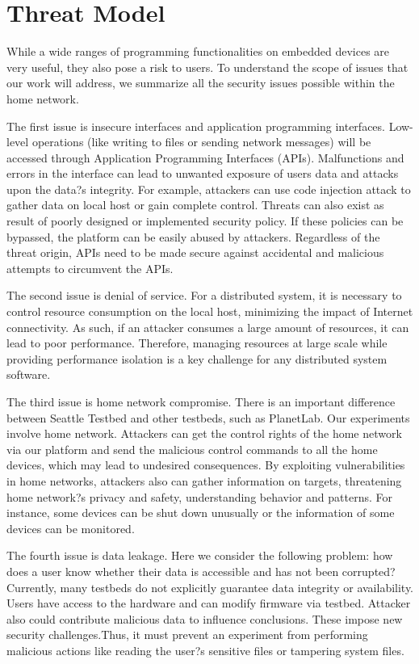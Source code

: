 \section{Threat Model}
\label{sec.threat_model}
While a wide ranges of programming functionalities on embedded devices are very useful, they also pose a risk to users. To understand the scope of issues that our work will address, we summarize all the security issues possible within the home network.

The first issue is insecure interfaces and application programming interfaces. Low-level operations (like writing to files or sending network messages) will be accessed through Application Programming Interfaces (APIs). Malfunctions and errors in the interface can lead to unwanted exposure of users data and attacks upon the data?s integrity. For example, attackers can use code injection attack to gather data on local host or gain complete control. Threats can also exist as result of  poorly designed or implemented security policy. If these policies can be bypassed, the platform can be easily abused by attackers. Regardless of the threat origin, APIs need to be made secure against accidental and malicious attempts to circumvent the APIs.

The second issue is denial of service. For a distributed system, it is necessary to control resource consumption on the local host, minimizing the impact of Internet connectivity. As such, if an attacker consumes a large amount of resources, it can lead to poor performance. Therefore, managing resources at large scale while providing performance isolation is a key challenge for any distributed system software.

The third issue is home network compromise. There is an important difference between Seattle Testbed and other testbeds, such as PlanetLab. Our experiments involve home network. Attackers can get the control rights of the home network via our platform and send the malicious control commands to all the home devices, which may lead to undesired consequences. By exploiting vulnerabilities in home networks, attackers also can gather information on targets, threatening home network?s privacy and safety, understanding behavior and patterns. For instance, some devices can be shut down unusually or the information of some devices can be monitored.

The fourth issue is data leakage. Here we consider the following problem: how does a user know whether their data is accessible and has not been corrupted? Currently, many testbeds do not explicitly guarantee data integrity or availability. Users have access to the hardware and can modify firmware via testbed. Attacker also could contribute malicious data to influence conclusions. These impose new security challenges.Thus, it must prevent an experiment from performing malicious actions like reading the user?s sensitive files or tampering system files.
